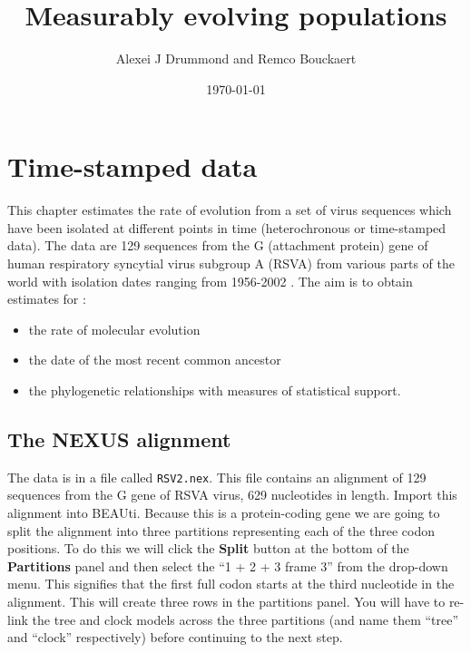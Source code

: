 \documentclass[12pt]{article}
\begin{document}
\author{Alexei J Drummond and Remco Bouckaert}

\date{\today{}}

\title{Measurably evolving populations \label{chap.MEP}}
\maketitle




\section{Time-stamped data}

This chapter estimates the rate of evolution from a set of virus sequences which have been isolated at different points in time (heterochronous or time-stamped data). The data are 129 sequences from the G (attachment protein) gene of human respiratory
syncytial virus subgroup A (RSVA) from various parts of the world with isolation dates ranging from 1956-2002 \cite{Zlateva:2004uq,Zlateva:2005qy}.
The aim is to obtain estimates for :

\begin{itemize}
\item the rate of molecular evolution
\item the date of the most recent common ancestor
\item the phylogenetic relationships with measures of statistical support.
\end{itemize}

\subsection*{The NEXUS alignment}
The data is in a file called \texttt{RSV2.nex}. This file contains an alignment of 129 sequences from the G gene of RSVA virus, 629 nucleotides in length. Import this alignment into BEAUti. Because this is a protein-coding gene we are going to split the alignment into three partitions representing each of the three codon positions. To do this we will click the {\bf Split} button at the bottom of the {\bf Partitions} panel and then select the ``1 + 2 + 3 frame 3'' from the drop-down menu. This signifies that the first full codon starts at the third nucleotide in the alignment. This will create three rows in the partitions panel. You will have to re-link the tree and clock models across the three partitions (and name them ``tree'' and ``clock'' respectively) before continuing to the next step.
\end{document}
